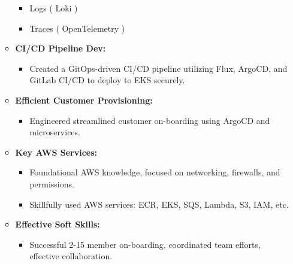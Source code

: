 \documentclass[10pt,a4paper]{altacv}
\begin{document}
\begin{itemize}
\begin{itemize}
\begin{itemize}
        \item Logs ( Loki )
        \item Traces ( OpenTelemetry )
  \end{itemize}
\item \textbf{CI/CD Pipeline Dev:}
  \begin{itemize}
    \item Created a GitOps-driven CI/CD pipeline utilizing Flux, ArgoCD, and GitLab CI/CD to deploy to EKS securely. 
  \end{itemize}
\item \textbf{Efficient Customer Provisioning:}
  \begin{itemize}
    \item Engineered streamlined customer on-boarding using ArgoCD and microservices.
  \end{itemize}
\item \textbf{Key AWS Services:}
  \begin{itemize}
  \item Foundational AWS knowledge, focused on networking, firewalls, and permissions.
    \item Skillfully used AWS services: ECR, EKS, SQS, Lambda, S3, IAM, etc.
  \end{itemize}
\item \textbf{Effective Soft Skills:}
  \begin{itemize}
    \item Successful 2-15 member on-boarding, coordinated team efforts, effective collaboration.
  \end{itemize}
  \end{itemize}
\end{itemize}
\end{document}
